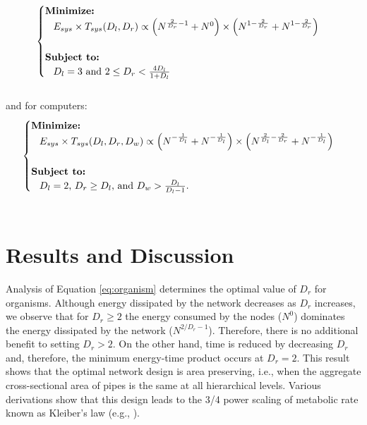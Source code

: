 \documentclass[12pt]{article}
\begin{document}
\begin{equation}
\begin{cases}
\text{{\bf Minimize:}}\\
\text{\;\;\;} E_{sys}\times T_{sys} (D_l, D_r) \propto \left( 
N^{\frac{2}{D_r}-1} + N^0 \right) \times \left( N^{1 
- \frac{2}{D_r}}+ N^{1 
- \frac{2}{D_r}}\right)\\
\,\\
\text{{\bf Subject to:}}\\
\text{\;\;\;} D_l = 3\text{ and } 2\leq D_r < \frac{4D_l}{1 + D_l}
\end{cases}
\label{eq:organism}
\end{equation}\\

and for computers:
\begin{equation}
\begin{cases}
\text{{\bf Minimize:}}\\
\text{\;\;\;} E_{sys}\times T_{sys} (D_l, D_r, D_w) \propto \left( N^{
- \frac{1}{D_l}} + N^{- \frac{1}{D_l}}\right) \times \left( 
  N^{\frac{2}{D_l} -\frac{2}{D_r}}  + N^{ - \frac{1}{D_l}}\right)\\
\,\\
\text{{\bf Subject to:}}\\
\text{\;\;\;} D_l=2 \text{, } D_r \geq D_l \text{, and } D_w > 
\frac{D_l}{D_l-1}.
\end{cases}
\label{eq:computer}
\end{equation}\\

\section{Results and Discussion}
\label{sec:discussion}

Analysis of Equation \ref{eq:organism} determines the optimal value of 
$D_r$ for organisms. Although energy dissipated by the network 
decreases as $D_r$ increases, we observe that for $D_r\geq 2$ the 
energy consumed by the nodes ($N^0$) dominates the energy dissipated 
by the network ($N^{2/D_r - 1}$).  Therefore, there is no additional 
benefit to setting $D_r>2$.  On the other hand, time is reduced by 
decreasing $D_r$ and, therefore, the minimum energy-time product 
occurs at $D_r = 2$.  This result shows that the optimal network 
design is area preserving, i.e., when the aggregate cross-sectional 
area of pipes is the same at all hierarchical levels. Various 
derivations show that this design leads to the 3/4 power scaling of 
metabolic rate known as Kleiber's law (e.g., \cite{west97, 
banavar10}).
\end{document}
